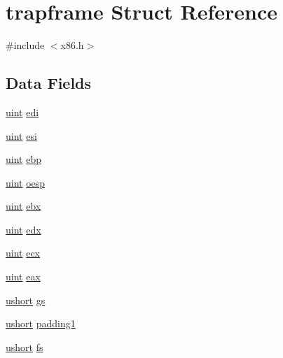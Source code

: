 \hypertarget{structtrapframe}{\section{trapframe Struct Reference}
\label{structtrapframe}
}


{\ttfamily \#include $<$x86.\-h$>$}

\subsection*{Data Fields}
\begin{DoxyCompactItemize}
\item 
\hyperlink{types_8h_a91ad9478d81a7aaf2593e8d9c3d06a14}{uint} \hyperlink{structtrapframe_a5d017b35dd2b40671e27c7ae6c276b23}{edi}
\item 
\hyperlink{types_8h_a91ad9478d81a7aaf2593e8d9c3d06a14}{uint} \hyperlink{structtrapframe_ab40e0917bb6e7e462049fc4151201f0a}{esi}
\item 
\hyperlink{types_8h_a91ad9478d81a7aaf2593e8d9c3d06a14}{uint} \hyperlink{structtrapframe_a8d9d61f0e845561448cf50ddf637e6b3}{ebp}
\item 
\hyperlink{types_8h_a91ad9478d81a7aaf2593e8d9c3d06a14}{uint} \hyperlink{structtrapframe_a2fe573b67842f4aaa53302d128ac3ef3}{oesp}
\item 
\hyperlink{types_8h_a91ad9478d81a7aaf2593e8d9c3d06a14}{uint} \hyperlink{structtrapframe_a685d686dce7abed5d536f3304c4692b9}{ebx}
\item 
\hyperlink{types_8h_a91ad9478d81a7aaf2593e8d9c3d06a14}{uint} \hyperlink{structtrapframe_a897b994c12c5e0174809a975642fe7fb}{edx}
\item 
\hyperlink{types_8h_a91ad9478d81a7aaf2593e8d9c3d06a14}{uint} \hyperlink{structtrapframe_ab36b3e14ca8cf65ad02ef0b466bff207}{ecx}
\item 
\hyperlink{types_8h_a91ad9478d81a7aaf2593e8d9c3d06a14}{uint} \hyperlink{structtrapframe_a6f7100b52071edc47e593b1c6a9453cb}{eax}
\item 
\hyperlink{types_8h_ab95f123a6c9bcfee6a343170ef8c5f69}{ushort} \hyperlink{structtrapframe_aaeba1ea8da31d7740b55bc9d8efcacc5}{gs}
\item 
\hyperlink{types_8h_ab95f123a6c9bcfee6a343170ef8c5f69}{ushort} \hyperlink{structtrapframe_af1bf63d9df475699143c50918af7c3b9}{padding1}
\item 
\hyperlink{types_8h_ab95f123a6c9bcfee6a343170ef8c5f69}{ushort} \hyperlink{structtrapframe_a5f3d679db589770026f3d927f3fed7b7}{fs}
\item 

\end{DoxyCompactItemize}
